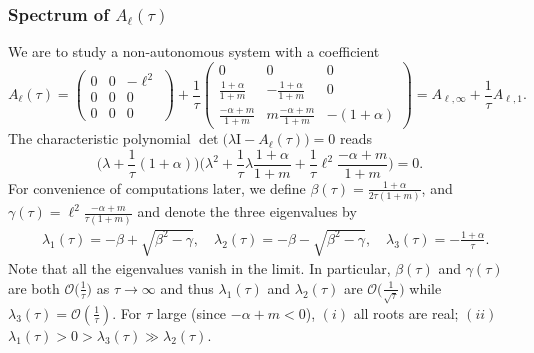 \documentclass[a4paper,11pt]{article}
\def\l{{\ell}}
\theoremstyle{remark}
\begin{document}
{\subsubsection{Spectrum of $A_\ell(\tau)$}

We are to study a non-autonomous system with a coefficient
\begin{equation} \label{eq:n0A}
  A_\ell(\tau)=\begin{pmatrix}
   0 & 0 & -\l^2\\
   0 & 0 & 0\\
   0 & 0 & 0
  \end{pmatrix}
  + \frac{1}{\tau}   \begin{pmatrix}
   0 & 0 & 0\\
   \frac{1+\alpha}{1+m} & -\frac{1+\alpha}{1+m} & 0\\
   \frac{-\alpha+m}{1+m} & m\frac{-\alpha+m}{1+m}& -(1+\alpha)
  \end{pmatrix} = A_{\ell,\infty} + \frac{1}{\tau}A_{\ell,1}.
\end{equation}
The characteristic polynomial $\det\big(\lambda \textrm{I} - A_\ell(\tau)\big)=0$ reads
$$ \Big(\lambda +\frac{1}{\tau}(1+\alpha)\Big)\Big( \lambda^2 + \frac{1}{\tau}\lambda \frac{1+\alpha}{1+m} + \frac{1}{\tau} \l^2 \frac{-\alpha+m}{1+m}\Big)=0.$$
For convenience of computations later, we define $\beta(\tau) = \frac{1+\alpha}{2\tau(1+m)}$, and $\gamma(\tau)= \l^2\frac{-\alpha+m}{\tau(1+m)}$ and denote the three eigenvalues by
\begin{equation} \label{eq:inviscid_roots}
\begin{aligned}
 &\lambda_1(\tau) = -\beta + \sqrt{\beta^2-\gamma}, \quad \lambda_2(\tau) = -\beta - \sqrt{\beta^2-\gamma}, \quad \lambda_3(\tau) = -\frac{1+\alpha}{\tau}.
\end{aligned}
\end{equation}
Note that all the eigenvalues vanish in the limit. In particular, $\beta(\tau)$ and $\gamma(\tau)$ are both $\mathcal{O}\big(\frac{1}{\tau}\big)$ as $\tau \rightarrow \infty$ and thus $\lambda_1(\tau)$ and $\lambda_2(\tau)$  are $\mathcal{O}\big(\frac{1}{\sqrt{\tau}}\big)$ while $\lambda_3(\tau)=\mathcal{O}(\frac{1}{\tau})$. For $\tau$ large (since $-\alpha+m<0$), $(i)$ all roots are real; $(ii)$ $\lambda_1(\tau) > 0 > \lambda_3(\tau) \gg \lambda_2(\tau)$. %

}
\end{document}
